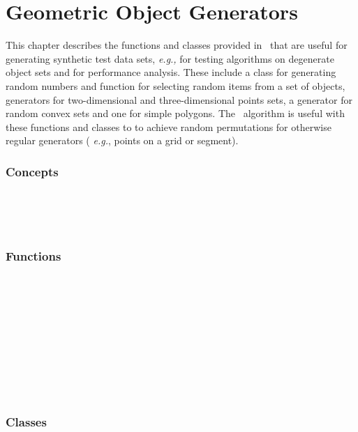 \chapter{Geometric Object Generators}
\label{sec:generators_ref}

This chapter describes the functions and classes provided in \cgal\ that
are useful for generating synthetic test data sets, \textit{e.g.,} for 
testing algorithms on degenerate object sets and for performance analysis.
These include a class for generating random numbers and function for selecting
random items from a set of objects,
generators for two-dimensional and three-dimensional points sets, a generator
for random convex sets and one for simple polygons.  The \stl\ algorithm
 is useful with these functions and classes to
to achieve random permutations for otherwise regular generators (
\textit{e.g.}, points on a grid or segment).

\subsection*{Concepts}
 \\
 \\
 \\

\subsection*{Functions}

 \\
 \\
 \\
 \\
 \\
 \\
 \\
 \\
 \\

\subsection*{Classes}

